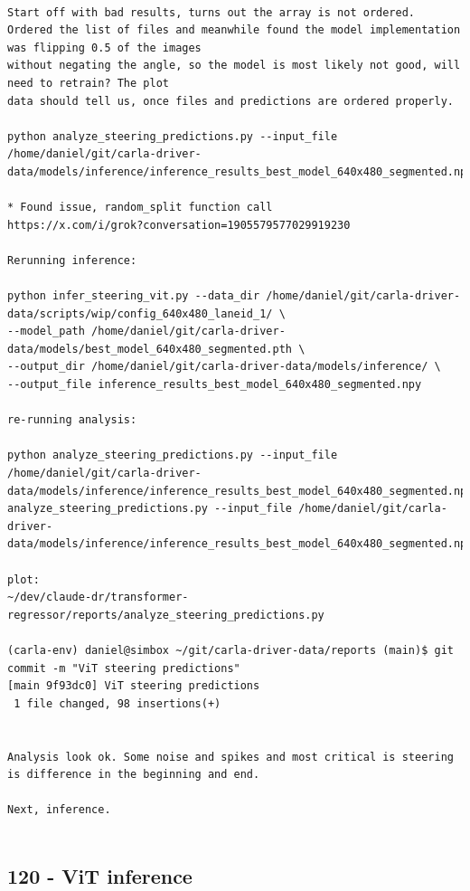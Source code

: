 \begin{verbatim}

Start off with bad results, turns out the array is not ordered. 
Ordered the list of files and meanwhile found the model implementation was flipping 0.5 of the images
without negating the angle, so the model is most likely not good, will need to retrain? The plot
data should tell us, once files and predictions are ordered properly.

python analyze_steering_predictions.py --input_file /home/daniel/git/carla-driver-data/models/inference/inference_results_best_model_640x480_segmented.npy

* Found issue, random_split function call
https://x.com/i/grok?conversation=1905579577029919230

Rerunning inference:

python infer_steering_vit.py --data_dir /home/daniel/git/carla-driver-data/scripts/wip/config_640x480_laneid_1/ \
--model_path /home/daniel/git/carla-driver-data/models/best_model_640x480_segmented.pth \
--output_dir /home/daniel/git/carla-driver-data/models/inference/ \
--output_file inference_results_best_model_640x480_segmented.npy

re-running analysis:

python analyze_steering_predictions.py --input_file /home/daniel/git/carla-driver-data/models/inference/inference_results_best_model_640x480_segmented.npypython analyze_steering_predictions.py --input_file /home/daniel/git/carla-driver-data/models/inference/inference_results_best_model_640x480_segmented.npy

plot:
~/dev/claude-dr/transformer-regressor/reports/analyze_steering_predictions.py 

(carla-env) daniel@simbox ~/git/carla-driver-data/reports (main)$ git commit -m "ViT steering predictions"
[main 9f93dc0] ViT steering predictions
 1 file changed, 98 insertions(+)


Analysis look ok. Some noise and spikes and most critical is steering is difference in the beginning and end.

Next, inference.
    
\end{verbatim}

\subsection{120 - ViT inference}
\label{app_res:120}

